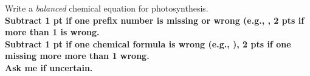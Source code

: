 \question[4]
Write a \emph{balanced} chemical equation for photosynthesis. 
\\
{\bfseries Subtract 1 pt if one prefix number is missing or wrong (e.g., , 2 pts if more than 1 is wrong. \\
Subtract 1 pt if one chemical formula is wrong (e.g., ), 2 pts if one missing more more than 1 wrong.\\Ask me if uncertain.}
\fi 
\vspace*{2\baselineskip}
